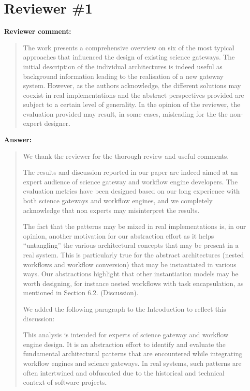 \documentclass[a4]{article}
\newenvironment{review}%
{\textbf{Reviewer comment:}\begin{quote}}%
{\end{quote}}%
\newenvironment{answer}%
{\textbf{Answer:}\begin{small}\begin{quote}}%
{\end{quote}\end{small}}%
\newcommand{\revised}[1]{\color{blue} #1\color{black}\xspace}
\begin{document}
\section{Reviewer \#1}

\begin{review}
  The work presents a comprehensive overview on six of the most
  typical approaches that influenced the design of existing science
  gateways. The initial description of the individual architectures is
  indeed useful as background information leading to the realisation
  of a new gateway system. However, as the authors acknowledge, the
  different solutions may coexist in real implementations and the
  abstract perspectives provided are subject to a certain level of
  generality. In the opinion of the reviewer, the evaluation provided
  may result, in some cases, misleading for the the non-expert
  designer.
\end{review}

\begin{answer}

  We thank the reviewer for the thorough review and useful comments.

  The results and discussion reported in our paper are indeed aimed at
  an expert audience of science gateway and workflow engine
  developers. The evaluation metrics have been designed based on our
  long experience with both science gateways and workflow engines, and
  we completely acknowledge that non experts may misinterpret the
  results.

  The fact that the patterns may be mixed in real implementations is,
  in our opinion, another motivation for our abstraction effort as it
  helps ``untangling'' the various architectural concepts that may be
  present in a real system. This is particularly true for the abstract
  architectures (nested workflows and workflow conversion) that may be
  instantiated in various ways. Our abstractions highlight that other
  instantiation models may be worth designing, for instance nested
  workflows with task encapsulation, as mentioned in Section 6.2. (Discussion).

  We added the following paragraph to the Introduction to reflect this discussion:

\revised{This analysis is intended for experts of science gateway
  and workflow engine design. It is an abstraction effort to identify
  and evaluate the fundamental architectural patterns that are
  encountered while integrating workflow engines and science
  gateways. In real systems, such patterns are often intertwined and
  obfuscated due to the historical and
  technical context of software projects.}

\end{answer}
\end{document}
